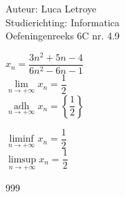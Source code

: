 \documentclass[a4paper]{article}
\begin{document}
  
\noindent \large Auteur: Luca Letroye \\
\noindent \large Studierichting: Informatica\\
\noindent \large Oefeningenreeks 6C nr. 4.9

\medskip
\normalsize

$x_n = \dfrac{3n^2+5n-4}{6n^2-6n-1}$\\

$\lim\limits_{n \rightarrow +\infty} x_n = \dfrac{1}{2}$\\

$\operatorname*{adh}\limits_{n \rightarrow +\infty} x_n = \left\{ \dfrac{1}{2} \right\}$

$\liminf\limits_{n \rightarrow +\infty} x_n = \dfrac{1}{2}$\\

$\limsup\limits_{n \rightarrow +\infty} x_n = \dfrac{1}{2}$\\






\begin{thebibliography}{999}
\end{thebibliography}
\end{document}
